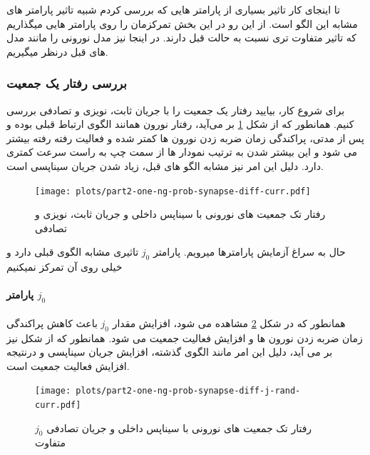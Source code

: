         تا اینجای کار تاثیر بسیاری از پارامتر هایی که بررسی کردم شبیه تاثیر پارامتر های مشابه این الگو است. از این رو در این بخش تمرکزمان را روی پارامتر هایی میگذاریم که تاثیر متفاوت تری نسبت به حالت قبل دارند. در اینجا نیز مدل نورونی را مانند مدل های قبل درنظر میگیریم.
        \subsubsection*{بررسی رفتار یک جمعیت}
            برای شروع کار، بیایید رفتار یک جمعیت را با جریان ثابت، نویزی و تصادفی بررسی کنیم. همانطور که از شکل 
            \ref{fig:part2-one-ng-prob-synapse-diff-curr}
            بر می‌آید، رفتار نورون همانند الگوی ارتباط قبلی بوده و پس از مدتی، پراکندگی زمان ضربه زدن نورون ها کمتر شده و فعالیت رفته رفته بیشتر می شود و این بیشتر شدن به ترتیب نمودار ها از سمت چپ به راست سرعت کمتری دارد. دلیل این امر نیز مشابه الگو های قبل، زیاد شدن جریان سیناپسی است.
            \begin{figure}[!ht]
                \centering
                \texttt{[image: plots/part2-one-ng-prob-synapse-diff-curr.pdf]} 
                \caption{رفتار تک جمعیت های نورونی با سیناپس داخلی و جریان ثابت، نویزی و تصادفی}
                \label{fig:part2-one-ng-prob-synapse-diff-curr}
            \end{figure}
            
            حال به سراغ آزمایش پارامترها میرویم. پارامتر 
            $j_0$ 
            تاثیری مشابه الگوی قبلی دارد و خیلی روی آن تمرکز نمیکنیم
            \paragraph*{پارامتر $j_0$}
                همانطور که در شکل
                \ref{fig:part2-one-ng-prob-synapse-diff-j-rand-curr}
                مشاهده می شود، افزایش مقدار 
                $j_0$ 
                باعث کاهش پراکندگی زمان ضربه زدن نورون ها و افزایش فعالیت جمعیت می شود. همانطور که از شکل نیز بر می آید، دلیل این امر مانند الگوی گذشته، افزایش جریان سیناپسی و درنتیجه افزایش فعالیت جمعیت است.
                \begin{figure}[!ht]
                    \centering
                    \texttt{[image: plots/part2-one-ng-prob-synapse-diff-j-rand-curr.pdf]} 
                    \caption{رفتار تک جمعیت های نورونی با سیناپس داخلی و جریان تصادفی $j_0$ متفاوت}
                    \label{fig:part2-one-ng-prob-synapse-diff-j-rand-curr}
                \end{figure}

